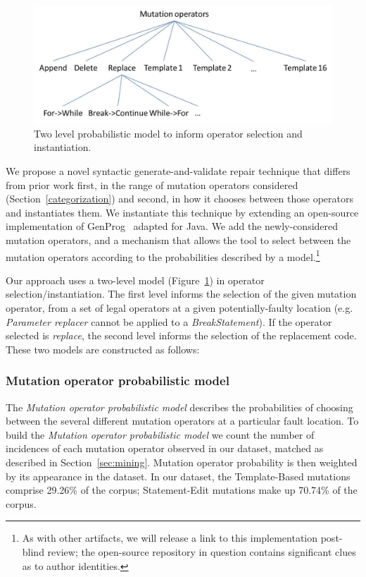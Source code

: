 \documentclass[conference]{IEEEtran}
\begin{document}
\begin{figure}[!h]
 \centering
    \includegraphics[width=\columnwidth]{Picture2}
  \caption{Two level probabilistic model to inform operator selection and instantiation. \label{fig:probModel}}
\end{figure}

We propose a novel syntactic generate-and-validate repair
technique that differs
from prior work first, in the range of mutation operators considered
(Section~\ref{categorization}) and second, in how it chooses between those
operators and instantiates them.  
We instantiate this technique by extending an open-source implementation of
GenProg~\cite{legoues12} adapted for Java.  We add the newly-considered mutation
operators, and a mechanism that allows the tool to
select between the mutation operators according to the probabilities described by
a model.\footnote{As with other artifacts, we will release a link to
  this implementation post-blind review; the open-source repository in question contains
  significant clues as to author identities.}


Our approach uses a two-level model (Figure~\ref{fig:probModel}) in operator
selection/instantiation.  The first level informs the selection of the given
mutation operator, from a set of legal operators at a given potentially-faulty
location (e.g. \emph{Parameter replacer} cannot be applied to a \emph{BreakStatement}).  If the operator selected is \emph{replace}, the second level informs the selection of the replacement code.  These two models are
constructed as follows: 

\subsubsection{Mutation operator probabilistic model}
The \textit{Mutation operator probabilistic model} 
describes the probabilities of choosing between the several different mutation 
operators at a particular fault location.
%
To build the \textit{Mutation operator probabilistic model} 
we count the number of incidences of each mutation operator observed in our
dataset, matched as described in Section~\ref{sec:mining}. Mutation operator probability is then
weighted by its appearance in the dataset.  
%
In our dataset, the Template-Based mutations comprise 29.26\% of the corpus; Statement-Edit mutations make up 70.74\% of the 
corpus.
\end{document}
